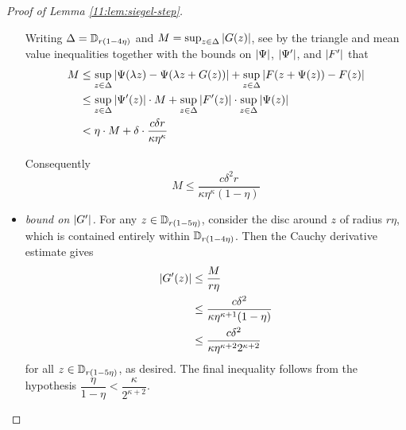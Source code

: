 \documentclass[../main.tex]{subfiles}
\begin{document}
\begin{proof}[Proof of Lemma \ref{11:lem:siegel-step}]
\begin{itemize}
    Writing $\Delta = \mathbb{D}_{r(1-4\eta)}$ and $M = \sup_{z \in \Delta} \left|G(z)\right|$, see by the triangle and mean value inequalities together with the bounds on $\left|\Psi\right|$, $\left|\Psi'\right|$, and $\left|F'\right|$ that
    \begin{align*}
        M
        &\le
        \sup_{z \in \Delta}
        \left|\Psi(\lambda z) - \Psi(\lambda z + G(z))\right|
        + 
        \sup_{z \in \Delta}
        \left|F(z + \Psi(z)) - F(z)\right|\\
        &\le
        \sup_{z \in \Delta}
        \left|\Psi'(z)\right| \cdot M
        + 
        \sup_{z \in \Delta}
        \left|F'(z)\right| \cdot
        \sup_{z \in \Delta}
        \left|\Psi(z)\right|\\
        &< \eta \cdot M + \delta \cdot \frac{c \delta r}{\kappa \eta^\kappa}
    \end{align*}
    
    Consequently
    \[
    M \le \frac{c \delta^2 r}{\kappa\eta^\kappa(1-\eta)}
    \]
    
    \item \emph{bound on $\left|G'\right|$.} For any $z \in \mathbb{D}_{r(1-5\eta)}$, consider the disc around $z$ of radius $r \eta$, which is contained entirely within $\mathbb{D}_{r(1-4\eta)}$. Then the Cauchy derivative estimate gives
    \begin{align*}
    \left|G'(z)\right|
    &\le \frac{M}{r\eta}\\
    &\le
    \frac{c \delta^2}{\kappa\eta^{\kappa+1}(1-\eta)}\\
    &\le
    \frac{c \delta^2}{\kappa\eta^{\kappa+2}2^{\kappa+2}}
    \end{align*}
    for all $z \in \mathbb{D}_{r(1-5\eta)}$, as desired. The final inequality follows from the hypothesis $\dfrac{\eta}{1-\eta} < \dfrac{\kappa}{2^{\kappa+2}}$.
    
\end{itemize}
\end{proof}
\end{document}
